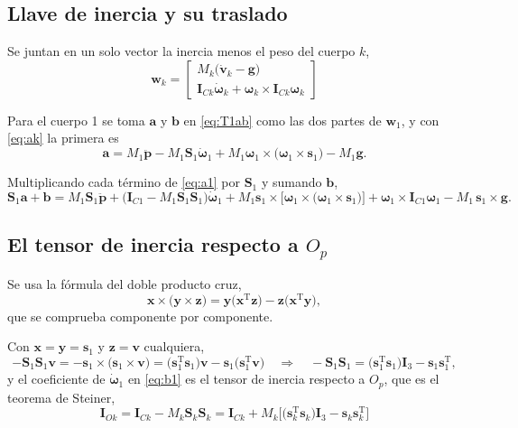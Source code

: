\documentclass[11pt]{article}
\newcommand{\T}{^{\mathrm{T}}}
\newcommand{\pvec}{\mathbf{p}}
\newcommand{\wv}{\boldsymbol{\omega}}
\newcommand{\IO}[1]{\mathbf{I}_{O#1}}
\newcommand{\IC}[1]{\mathbf{I}_{C#1}}
\begin{document}
\subsection{Llave de inercia y su traslado}

Se juntan en un solo vector la inercia menos el peso del cuerpo $k$,
\begin{equation}
\boxed{\ \mathbf{w}_k=
\begin{bmatrix}
M_k\big(\dot{\mathbf{v}}_k-\mathbf{g}\big)\\[2pt]
\IC{k}\dot{\wv}_k+\wv_k\times\IC{k}\wv_k
\end{bmatrix}\ }
\label{eq:wk}
\end{equation}

Para el cuerpo 1 se toma $\mathbf{a}$ y $\mathbf{b}$ en \eqref{eq:T1ab} como las dos partes de $\mathbf{w}_1$, y con \eqref{eq:ak} la primera es
\begin{equation}
\mathbf{a}=M_1\ddot{\pvec}-M_1\mathbf{S}_1\dot{\wv}_1+M_1\wv_1\times\big(\wv_1\times\mathbf{s}_1\big)-M_1\mathbf{g} .
\label{eq:a1}
\end{equation}

Multiplicando cada término de \eqref{eq:a1} por $\mathbf{S}_1$ y sumando $\mathbf{b}$,
\begin{equation}
\mathbf{S}_1\mathbf{a}+\mathbf{b}
=M_1\mathbf{S}_1\ddot{\pvec}
+\big(\IC{1}-M_1\mathbf{S}_1\mathbf{S}_1\big)\dot{\wv}_1
+M_1\mathbf{s}_1\times\Big[\wv_1\times\big(\wv_1\times\mathbf{s}_1\big)\Big]
+\wv_1\times\IC{1}\wv_1
-M_1\,\mathbf{s}_1\times\mathbf{g} .
\label{eq:b1}
\end{equation}

\subsection{El tensor de inercia respecto a $O_p$}

Se usa la fórmula del doble producto cruz,
\begin{equation}
\mathbf{x}\times\big(\mathbf{y}\times\mathbf{z}\big)=\mathbf{y}\big(\mathbf{x}\T\mathbf{z}\big)-\mathbf{z}\big(\mathbf{x}\T\mathbf{y}\big),
\label{eq:bac}
\end{equation}
que se comprueba componente por componente.

Con $\mathbf{x}=\mathbf{y}=\mathbf{s}_1$ y $\mathbf{z}=\mathbf{v}$ cualquiera,
\begin{equation}
-\mathbf{S}_1\mathbf{S}_1\mathbf{v}
=-\mathbf{s}_1\times\big(\mathbf{s}_1\times\mathbf{v}\big)
=\big(\mathbf{s}_1\T\mathbf{s}_1\big)\mathbf{v}-\mathbf{s}_1\big(\mathbf{s}_1\T\mathbf{v}\big)
\quad\Longrightarrow\quad
-\mathbf{S}_1\mathbf{S}_1=\big(\mathbf{s}_1\T\mathbf{s}_1\big)\mathbf{I}_3-\mathbf{s}_1\mathbf{s}_1\T ,
\label{eq:SS}
\end{equation}
y el coeficiente de $\dot{\wv}_1$ en \eqref{eq:b1} es el tensor de inercia respecto a $O_p$, que es el teorema de Steiner,
\begin{equation}
\boxed{\ \IO{k}=\IC{k}-M_k\mathbf{S}_k\mathbf{S}_k
=\IC{k}+M_k\Big[\big(\mathbf{s}_k\T\mathbf{s}_k\big)\mathbf{I}_3-\mathbf{s}_k\mathbf{s}_k\T\Big]\ }
\label{eq:IO}
\end{equation}
\end{document}
